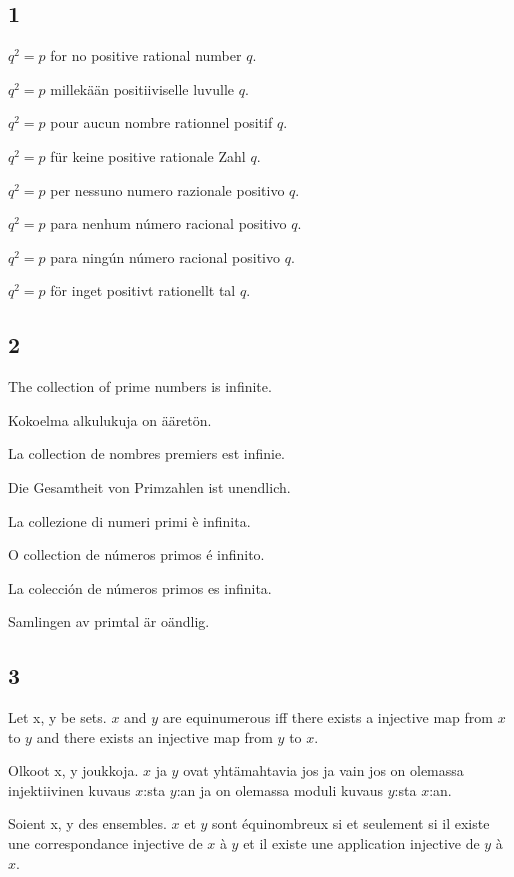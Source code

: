 \documentclass{article}
\begin{document}
\subsection*{1}

$ q^{2} = p $ for no positive rational number $ q $.

$ q^{2} = p $ millekään positiiviselle luvulle $ q $.

$ q^{2} = p $ pour aucun nombre rationnel positif $ q $.

$ q^{2} = p $ für keine positive rationale Zahl $ q $.

$ q^{2} = p $ per nessuno numero razionale positivo $ q $.

$ q^{2} = p $ para nenhum número racional positivo $ q $.

$ q^{2} = p $ para ningún número racional positivo $ q $.

$ q^{2} = p $ för inget positivt rationellt tal $ q $.

\subsection*{2}

The collection of prime numbers is infinite.

Kokoelma alkulukuja on ääretön.

La collection de nombres premiers est infinie.

Die Gesamtheit von Primzahlen ist unendlich.

La collezione di numeri primi è infinita.

O collection de números primos é infinito.

La colección de números primos es infinita.

Samlingen av primtal är oändlig.

\subsection*{3}

Let x, y be sets. $ x $ and $ y $ are equinumerous iff there exists a injective map from $ x $ to $ y $ and there exists an injective map from $ y $ to $ x $.

Olkoot x, y joukkoja. $ x $ ja $ y $ ovat yhtämahtavia jos ja vain jos on olemassa injektiivinen kuvaus $ x $:sta $ y $:an ja on olemassa moduli kuvaus $ y $:sta $ x $:an.

Soient x, y des ensembles. $ x $ et $ y $ sont équinombreux si et seulement si il existe une correspondance injective de $ x $ à $ y $ et il existe une application injective de $ y $ à $ x $.
\end{document}
